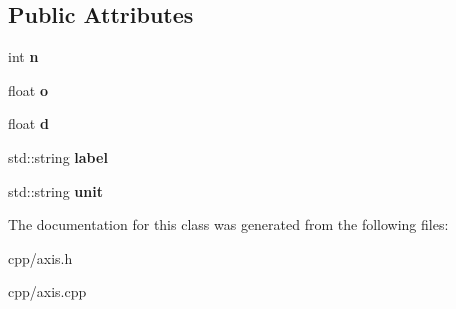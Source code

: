 \subsection*{Public Attributes}
\begin{DoxyCompactItemize}
\item 
\mbox{\label{class_s_e_p_1_1axis_ab8f479a0395db6db66ac51ee416c10cf}} 
int {\bfseries n}
\item 
\mbox{\label{class_s_e_p_1_1axis_ac63fc189274d4dd0e82a2b2e4045b259}} 
float {\bfseries o}
\item 
\mbox{\label{class_s_e_p_1_1axis_a75efb0179b1aeeba2bb86163fa128e9b}} 
float {\bfseries d}
\item 
\mbox{\label{class_s_e_p_1_1axis_ad8d81f2b8e0710b141235e186eac934e}} 
std\+::string {\bfseries label}
\item 
\mbox{\label{class_s_e_p_1_1axis_a280601dd1ce89c9216a0042c939e35c9}} 
std\+::string {\bfseries unit}
\end{DoxyCompactItemize}


The documentation for this class was generated from the following files\+:\begin{DoxyCompactItemize}
\item 
cpp/axis.\+h\item 
cpp/axis.\+cpp\end{DoxyCompactItemize}
